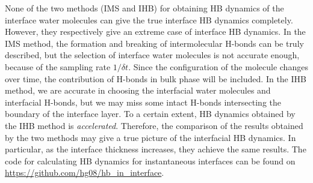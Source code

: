 None of the two methods (IMS and IHB) for obtaining HB dynamics of the interface water molecules 
can give the true interface HB dynamics completely. However, they respectively give an extreme case of interface HB dynamics. 
In the IMS method, the formation and breaking of intermolecular H-bonds can be truly described, 
but the selection of interface water molecules is not accurate enough, because of the sampling rate $1/{\delta t}$. 
Since the configuration of the molecule changes over time, 
the contribution of H-bonds in bulk phase will be included. 
In the IHB method, we are accurate in choosing the interfacial water molecules and interfacial H-bonds, 
but we may miss some intact H-bonds intersecting the boundary of the interface layer. 
To a certain extent, HB dynamics obtained by the IHB method is \emph{accelerated}. 
Therefore, the comparison of the results obtained by the two methods may give a true picture of the interfacial HB dynamics.
In particular, as the interface thickness increases, they achieve the same results.
The code for calculating HB dynamics for instantaneous interfaces can be found on \url{https://github.com/hg08/hb_in_interface}. 

